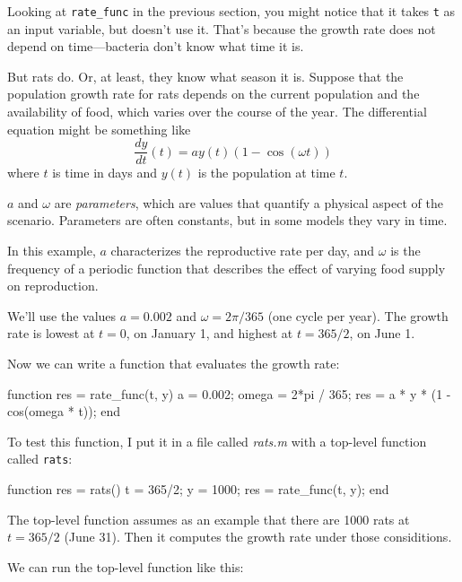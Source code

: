 Looking at \verb"rate_func" in the previous section, you might notice that it takes {\tt t} as an input variable, but doesn't use it.  That's because the growth rate does not depend on time---bacteria don't know what time it is.


But rats do.  Or, at least, they know what season it is.
Suppose that the population growth rate for rats
depends on the current population and the availability of food,
which varies over the course of the year.
The differential equation might be something like
%
\begin{equation}
\frac{dy}{dt}(t) = a y(t) \left(1 - \cos (\omega t) \right)
\end{equation}
%
where $t$ is time in days and $y(t)$ is the population at time $t$.

$a$ and $\omega$ are {\em parameters}, which are values that
quantify a physical aspect of the scenario.  Parameters are often constants, but in some models they vary in time.


In this example, $a$ characterizes the reproductive rate per day, and
$\omega$ is the frequency of a periodic function that describes
the effect of varying food supply on reproduction.

We'll use the values $a = 0.002$
and $\omega = 2 \pi/365$ (one cycle per year).
The growth rate is lowest at $t=0$, on January 1, and highest at $t=365/2$, on June 1.

Now we can write a function that evaluates the growth rate:

\begin{code}
function res = rate_func(t, y)
    a = 0.002;
    omega = 2*pi / 365;
    res = a * y * (1 - cos(omega * t));
end
\end{code}

To test this function, I put it in a file called {\em rats.m} with a top-level function called 
{\tt rats}:

\begin{code}
function res = rats()
    t = 365/2;
    y = 1000;
    res = rate_func(t, y);
end
\end{code}

The top-level function assumes as an example that
there are 1000 rats at $t=365/2$ (June 31).  Then it computes the growth rate under those considitions.

We can run the top-level function like this:

